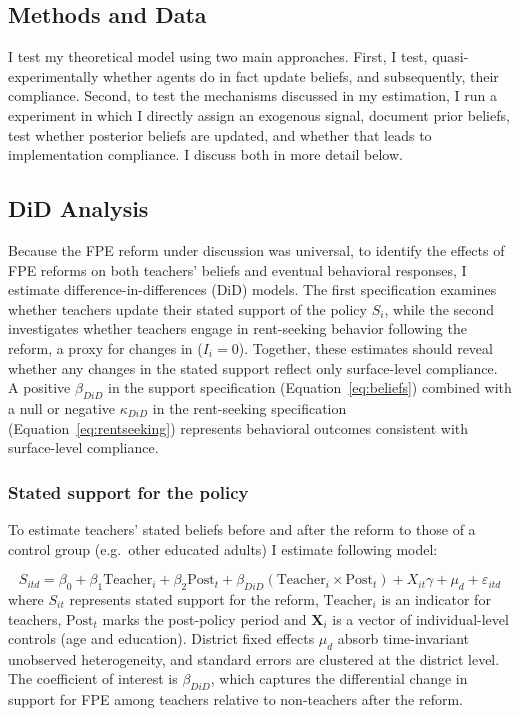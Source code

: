 \documentclass[hidelinks,12pt]{article}
\begin{document}
\begin{singlespace}
\section{Methods and Data}
I test my theoretical model using two main approaches. First, I test, quasi-experimentally whether agents do in fact update beliefs, and subsequently, their compliance. Second, to test the mechanisms discussed in my estimation, I run a experiment in which I directly assign an exogenous signal, document prior beliefs, test whether posterior beliefs are updated, and whether that leads to implementation compliance. I discuss both in more detail below.

\subsection{DiD Analysis}\label{sec:econometrics}
Because the FPE reform under discussion was universal, to identify the effects of FPE reforms on both teachers’ beliefs and eventual behavioral responses, I estimate difference-in-differences (DiD) models. The first specification examines whether teachers update their stated support of the policy $S_i$, while the second investigates whether teachers engage in rent-seeking behavior following the reform, a proxy for changes in ($I_i=0$). Together, these estimates should reveal whether any changes in the stated support reflect only surface-level compliance. A positive $\beta_{DiD}$ in the support specification (Equation~\ref{eq:beliefs}) combined with a null or negative $\kappa_{DiD}$ in the rent-seeking specification (Equation~\ref{eq:rentseeking}) represents behavioral outcomes consistent with surface-level compliance.

\subsubsection{Stated support for the policy}
To estimate teachers’ stated beliefs before and after the reform to those of a control group (e.g.\ other educated adults) I estimate following model:  
\vspace{-1em}

\begin{equation} 
S_{itd} = \beta_0 + \beta_1 \text{Teacher}_i + \beta_2 \text{Post}_t + \beta_{DiD} (\text{Teacher}_i \times \text{Post}_t) + X_{it}\gamma + \mu_{d} + \varepsilon_{itd}
\label{eq:beliefs}
\end{equation}
where $S_{it}$ represents stated support for the reform, $\text{Teacher}_i$ is an indicator for teachers, $\text{Post}_t$ marks the post-policy period and $\mathbf{X}_{i}$ is a vector of individual-level controls (age and education). District fixed effects $\mu_{d}$ absorb time-invariant unobserved heterogeneity, and standard errors are clustered at the district level. The coefficient of interest is $\beta_{DiD}$, which captures the differential change in support for FPE among teachers relative to non-teachers after the reform.


\end{singlespace}
\end{document}

